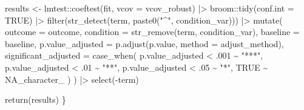 \documentclass[
  letterpaper,
  DIV=11,
  numbers=noendperiod]{scrartcl}
\newenvironment{Shaded}{\begin{snugshade}}{\end{snugshade}}
\newcommand{\AttributeTok}[1]{\textcolor[rgb]{0.40,0.45,0.13}{#1}}
\newcommand{\CommentTok}[1]{\textcolor[rgb]{0.37,0.37,0.37}{#1}}
\newcommand{\ConstantTok}[1]{\textcolor[rgb]{0.56,0.35,0.01}{#1}}
\newcommand{\DecValTok}[1]{\textcolor[rgb]{0.68,0.00,0.00}{#1}}
\newcommand{\FunctionTok}[1]{\textcolor[rgb]{0.28,0.35,0.67}{#1}}
\newcommand{\NormalTok}[1]{\textcolor[rgb]{0.00,0.23,0.31}{#1}}
\newcommand{\OtherTok}[1]{\textcolor[rgb]{0.00,0.23,0.31}{#1}}
\newcommand{\SpecialCharTok}[1]{\textcolor[rgb]{0.37,0.37,0.37}{#1}}
\newcommand{\StringTok}[1]{\textcolor[rgb]{0.13,0.47,0.30}{#1}}
\begin{document}
\begin{Shaded}
\begin{Highlighting}[]
\NormalTok{  results }\OtherTok{\textless{}{-}}\NormalTok{ lmtest}\SpecialCharTok{::}\FunctionTok{coeftest}\NormalTok{(fit, }\AttributeTok{vcov =}\NormalTok{ vcov\_robust) }\SpecialCharTok{|\textgreater{}}
\NormalTok{    broom}\SpecialCharTok{::}\FunctionTok{tidy}\NormalTok{(}\AttributeTok{conf.int =} \ConstantTok{TRUE}\NormalTok{) }\SpecialCharTok{|\textgreater{}}
    \FunctionTok{filter}\NormalTok{(}\FunctionTok{str\_detect}\NormalTok{(term, }\FunctionTok{paste0}\NormalTok{(}\StringTok{"\^{}"}\NormalTok{, condition\_var))) }\SpecialCharTok{|\textgreater{}}
    \FunctionTok{mutate}\NormalTok{(}
      \AttributeTok{outcome          =}\NormalTok{ outcome,}
      \AttributeTok{condition        =} \FunctionTok{str\_remove}\NormalTok{(term, condition\_var),}
      \AttributeTok{baseline         =}\NormalTok{ baseline,}
      \AttributeTok{p.value\_adjusted =} \FunctionTok{p.adjust}\NormalTok{(p.value, }\AttributeTok{method =}\NormalTok{ adjust\_method), }
      \AttributeTok{significant\_adjusted =} \FunctionTok{case\_when}\NormalTok{(}
\NormalTok{        p.value\_adjusted }\SpecialCharTok{\textless{}}\NormalTok{ .}\DecValTok{001} \SpecialCharTok{\textasciitilde{}} \StringTok{"***"}\NormalTok{,}
\NormalTok{        p.value\_adjusted }\SpecialCharTok{\textless{}}\NormalTok{ .}\DecValTok{01}  \SpecialCharTok{\textasciitilde{}} \StringTok{"**"}\NormalTok{,}
\NormalTok{        p.value\_adjusted }\SpecialCharTok{\textless{}}\NormalTok{ .}\DecValTok{05}  \SpecialCharTok{\textasciitilde{}} \StringTok{"*"}\NormalTok{,}
        \ConstantTok{TRUE}                    \SpecialCharTok{\textasciitilde{}} \ConstantTok{NA\_character\_}
\NormalTok{      )}
\NormalTok{    ) }\SpecialCharTok{|\textgreater{}}
    \FunctionTok{select}\NormalTok{(}\SpecialCharTok{{-}}\NormalTok{term)}
  
  \FunctionTok{return}\NormalTok{(results)}
\NormalTok{\}}
\end{Highlighting}
\end{Shaded}

\begin{Shaded}
\end{Shaded}
\end{document}
